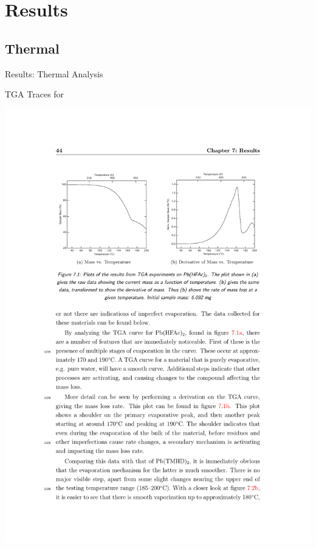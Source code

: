 \documentclass[professionalfont]{beamer}
\begin{document}

\section{Results}

\subsection{Thermal}
\begin{frame}{Results: Thermal Analysis}
\begin{overprint}
		\begin{center}
		TGA Traces for \\
		\vspace{0.5cm}
		\centerline{\includegraphics[width=\textwidth]{./graphics/data/tga/hfac}}
		\end{center}

\end{overprint}
\end{frame}
\end{document}
